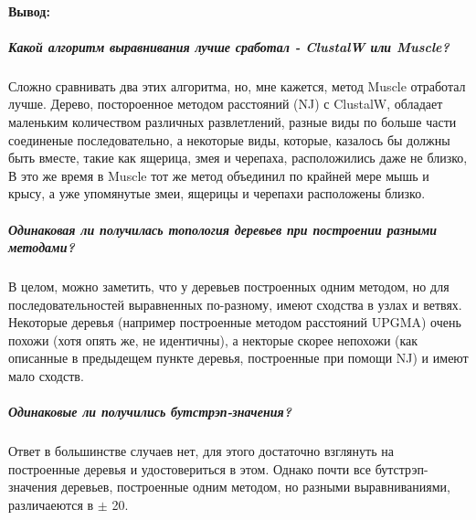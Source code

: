 \documentclass[12pt]{article}
\begin{document}
\paragraph{Вывод:}
\subparagraph{Какой алгоритм выравнивания лучше сработал -  ClustalW или Muscle?\\}
Сложно сравнивать два этих алгоритма, но, мне кажется, метод Muscle отработал лучше. Дерево, постороенное методом расстояний (NJ) с ClustalW, обладает маленьким количеством различных развлетлений, разные виды по больше части соединеные последовательно, а некоторые виды, которые, казалось бы должны быть вместе, такие как ящерица, змея и черепаха, расположились даже не близко, В это же время в Muscle тот же метод объединил по крайней мере мышь и крысу, а уже упомянутые змеи, ящерицы и черепахи расположены близко.

\subparagraph{Одинаковая ли получилась топология деревьев при построении разными методами?\\}
В целом, можно заметить, что у деревьев построенных одним методом, но для последовательностей выравненных по-разному, имеют сходства в узлах и ветвях. Некоторые деревья (например построенные методом расстояний UPGMA) очень похожи (хотя опять же, не идентичны), а некторые скорее непохожи (как описанные в предыдещем пункте деревья, построенные при помощи NJ) и имеют мало сходств.

\subparagraph{Одинаковые ли получились бутстрэп-значения?\\}
Ответ в большинстве случаев нет, для этого достаточно взглянуть на построенные деревья и удостовериться в этом. Однако почти все бутстрэп-значения деревьев, построенные одним методом, но разными выравниваниями, различаеются в $\pm$ 20.
\end{document}

